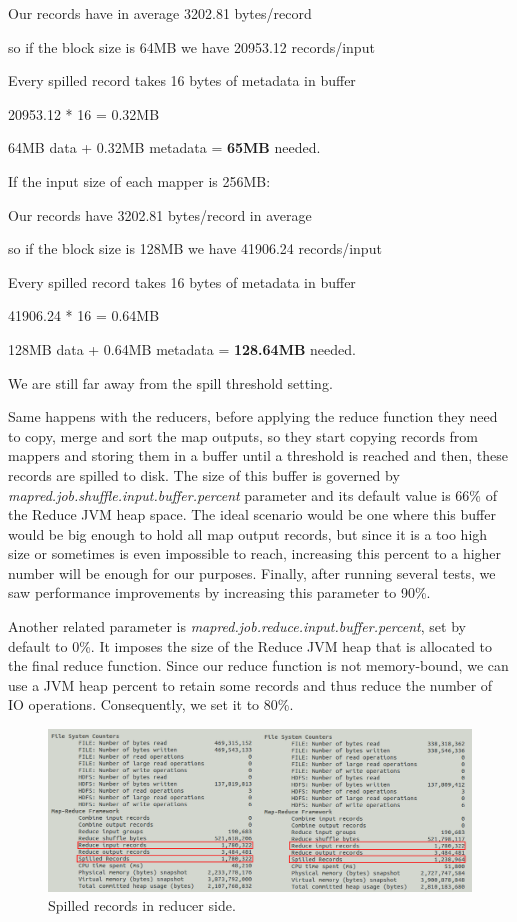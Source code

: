 \begin{itemize}
\centerline{Our records have in average 3202.81 bytes/record}
\centerline{so if the block size is 64MB we have 20953.12 records/input}
\centerline{Every spilled record takes 16 bytes of metadata in buffer}
\centerline{20953.12 * 16 = 0.32MB}
\centerline{64MB data + 0.32MB metadata = \textbf{65MB} needed.}

\bigskip

If the input size of each mapper is 256MB:

\bigskip
\centerline{Our records have 3202.81 bytes/record in average}
\centerline{so if the block size is 128MB we have 41906.24 records/input}      
\centerline{Every spilled record takes 16 bytes of metadata in buffer}
\centerline{41906.24 * 16 = 0.64MB}
\centerline{128MB data + 0.64MB metadata = \textbf{128.64MB} needed.}
\bigskip
\par
We are still far away from the spill threshold setting. 

\bigskip

Same happens with the reducers, before applying the reduce function they need to copy, merge and sort the map outputs, so they start copying records from mappers and storing them in a buffer until a threshold is reached and then, these records are spilled to disk. The size of this buffer is governed by \textit{mapred.job.shuffle.input.buffer.percent} parameter and its default value is 66\% of the Reduce JVM heap space. The ideal scenario would be one where this buffer would be big enough to hold all map output records, but since it is a too high size or sometimes is even impossible to reach, increasing this percent to a higher number will be enough for our purposes. Finally, after running several tests, we saw performance improvements by increasing this parameter to 90\%.
\par 
Another related parameter is \textit{mapred.job.reduce.input.buffer.percent}, set by default to 0\%. It imposes the size of the Reduce JVM heap that is allocated to the final reduce function. Since our reduce function is not memory-bound, we can use a JVM heap percent to retain some records and thus reduce the number of IO operations. Consequently, we set it to 80\%.


\begin{figure}[htb]
\centering
\includegraphics[width=1\textwidth]{./images/spilledReducerRecords.png}
\caption{Spilled records in reducer side.} \label{fig:spilledReducerRecords}
\end{figure}


\end{itemize}

